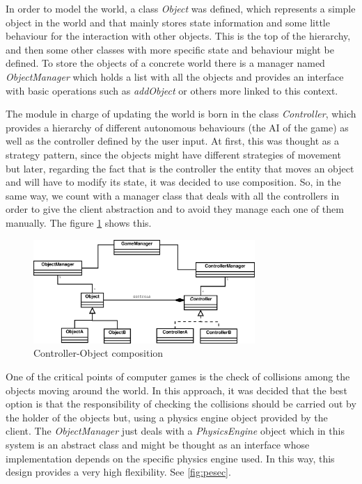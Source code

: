 \documentclass[]{article}
\begin{document}
In order to model the world, a class \emph{Object} was defined, which represents a simple object in the world and that mainly stores state information and some little behaviour for the interaction
with other objects. This is the top of the hierarchy, and then some other classes with more specific state and behaviour might be defined. To store the objects of a concrete world there is a manager
named \emph{ObjectManager} which holds a list with all the objects and provides an interface with basic operations such as \emph{addObject} or others more linked to this context.

The module in charge of updating the world is born in the class \emph{Controller}, which provides a hierarchy of different autonomous behaviours (the AI of the game) as well as the controller defined
by the user input. At first, this was thought as a strategy pattern, since the objects might have different strategies of movement but later, regarding the fact that is the controller the entity
that moves an object and will have to modify its state, it was decided to use composition. So, in the same way, we count with a manager class that deals with all the controllers in order to give 
the client abstraction and to avoid they manage each one of them manually. The figure \ref{fig:object-controller} shows this.

\begin{figure}[h]
\begin{center}
\includegraphics[width=0.75\textwidth]{images/object-controller.eps}
\caption{Controller-Object composition}
\label{fig:object-controller}
\end{center}
\end{figure}

One of the critical points of computer games is the check of collisions among the objects moving around the world. In this approach, it was decided that the best option is that the responsibility
of checking the collisions should be carried out by the holder of the objects but, using a physics engine object provided by the client. The \emph{ObjectManager} just deals with a \emph{PhysicsEngine}
object which in this system is an abstract class and might be thought as an interface whose implementation depends on the specific physics engine used. In this way, this design provides a very high
flexibility. See \ref{fig:pesec}.
\end{document}
